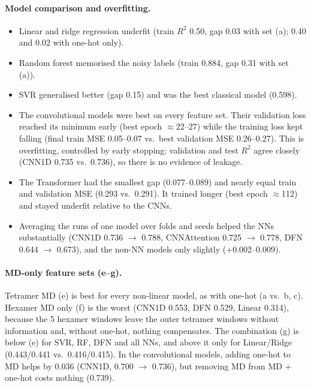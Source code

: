 \documentclass[11pt,a4paper]{article}
\begin{document}
\paragraph{Model comparison and overfitting.}
\begin{itemize}
\item Linear and ridge regression underfit (train $R^2$ 0.50, gap 0.03 with set (a); 0.40 and 0.02 with one-hot only).
\item Random forest memorised the noisy labels (train 0.884, gap 0.31 with set (a)).
\item SVR generalised better (gap 0.15) and was the best classical model (0.598).
\item The convolutional models were best on every feature set. Their validation loss reached its minimum early (best epoch $\approx$22--27) while the training loss kept falling (final train MSE 0.05--0.07 vs.\ best validation MSE 0.26--0.27). This is overfitting, controlled by early stopping: validation and test $R^2$ agree closely (CNN1D 0.735 vs.\ 0.736), so there is no evidence of leakage.
\item The Transformer had the smallest gap (0.077--0.089) and nearly equal train and validation MSE (0.293 vs.\ 0.291). It trained longer (best epoch $\approx$112) and stayed underfit relative to the CNNs.
\item Averaging the runs of one model over folds and seeds helped the NNs substantially (CNN1D 0.736 $\to$ 0.788, CNNAttention 0.725 $\to$ 0.778, DFN 0.644 $\to$ 0.673), and the non-NN models only slightly (+0.002--0.009).
\end{itemize}

\paragraph{MD-only feature sets (e--g).} Tetramer MD (e) is best for every non-linear model, as with one-hot (a vs.\ b, c). Hexamer MD only (f) is the worst (CNN1D 0.553, DFN 0.529, Linear 0.314), because the 5 hexamer windows leave the outer tetramer windows without information and, without one-hot, nothing compensates. The combination (g) is below (e) for SVR, RF, DFN and all NNs, and above it only for Linear/Ridge (0.443/0.441 vs.\ 0.416/0.415). In the convolutional models, adding one-hot to MD helps by 0.036 (CNN1D, 0.700 $\to$ 0.736), but removing MD from MD + one-hot costs nothing (0.739).
\end{document}
